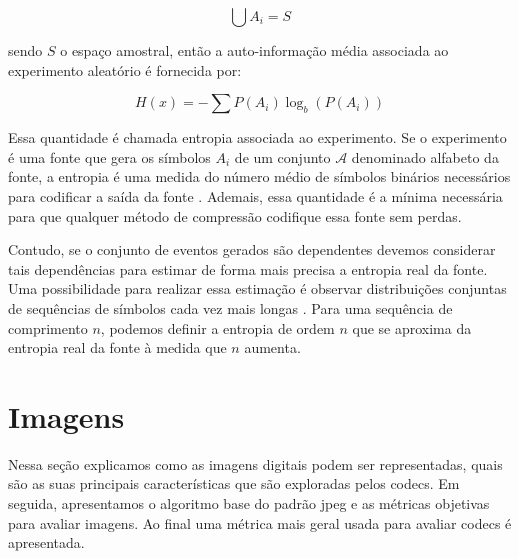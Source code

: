 \begin{equation}
\bigcup A_i = S 
\end{equation}

\noindent sendo $S$ o espaço amostral, então a auto-informação média associada ao experimento aleatório é fornecida por:

\begin{equation}
H(x) = -\sum P(A_i)\log_b(P(A_i))
\end{equation}

Essa quantidade é chamada entropia associada ao	experimento. Se o experimento é uma fonte que gera os símbolos $A_i$ de um conjunto $\mathcal{A}$ denominado alfabeto da fonte, a entropia é uma medida do número médio de símbolos binários necessários para codificar a saída da fonte  \cite{sayood2017introduction}. Ademais, essa quantidade é a mínima necessária para que qualquer método de compressão codifique essa fonte sem perdas.

Contudo, se o conjunto de eventos gerados são dependentes devemos considerar tais dependências para estimar de forma mais precisa a entropia real da fonte. 
Uma possibilidade para realizar essa estimação é observar distribuições conjuntas de sequências de símbolos cada vez mais longas \cite{sayood2017introduction}. Para uma sequência de comprimento $n$, podemos definir a entropia de ordem $n$ que se aproxima da entropia real da fonte à medida que $n$ aumenta. 




\section{Imagens}
Nessa seção explicamos como as imagens digitais podem ser representadas, quais são as suas principais características que são exploradas pelos \acrshort{codec}s. Em seguida, apresentamos o algoritmo base do padrão \acrshort{jpeg} e as métricas objetivas para avaliar imagens. Ao final uma métrica mais geral usada para avaliar \acrshort{codec}s é apresentada. 

